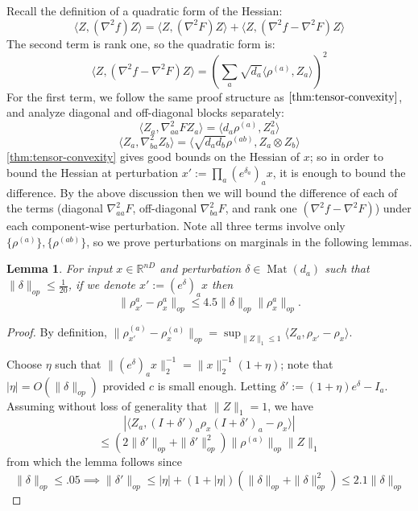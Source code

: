 \documentclass[aos]{imsart}
\newtheorem{lemma}[theorem]{Lemma}
\theoremstyle{definition}
\DeclareMathOperator{\mat}{Mat}
\newcommand{\R}{{\mathbb{R}}}
\newcommand{\samp}{x}
\begin{document}
\begin{appendix}
Recall the definition of a quadratic form of the Hessian:
\[ \langle Z, (\nabla^{2} f) Z \rangle = \langle Z, (\nabla^{2} F) Z \rangle + \langle Z, (\nabla^{2} f - \nabla^{2} F) Z \rangle     \]
The second term is rank one, so the quadratic form is:
\[ \langle Z, (\nabla^{2} f - \nabla^{2} F) Z \rangle = \left( \sum_{a} \sqrt{d_{a}} \langle \rho^{(a)}, Z_{a} \rangle   \right)^{2}       \]
For the first term, we follow the same proof structure as $\cref{thm:tensor-convexity}$, and analyze diagonal and off-diagonal blocks separately:
\[ \langle Z_{a}, \nabla^{2}_{aa} F Z_{a} \rangle = \langle d_{a} \rho^{(a)}, Z_{a}^{2} \rangle       \]
\[ \langle Z_{a}, \nabla^{2}_{ba} Z_{b} \rangle = \langle \sqrt{d_{a} d_{b}} \rho^{(ab)}, Z_{a} \otimes Z_{b} \rangle   \]
\cref{thm:tensor-convexity} gives good bounds on the Hessian of $\samp$; so in order to bound the Hessian at perturbation $\samp' := \prod_{a} (e^{\delta_{a}})_{a} \samp$, it is enough to bound the difference. By the above discussion then we will bound the difference of each of the terms (diagonal $\nabla^{2}_{aa} F$, off-diagonal $\nabla^{2}_{ba} F$, and rank one $(\nabla^{2} f - \nabla^{2} F)$) under each component-wise perturbation. Note all three terms involve only $\{\rho^{(a)}\}, \{\rho^{(ab)}\}$, so we prove perturbations on marginals in the following lemmas.

\begin{lemma} \label{atoaaRobustness}
For input $\samp \in \R^{nD}$ and perturbation $\delta \in \mat(d_{a})$ such that $\|\delta\|_{op} \leq \frac{1}{20}$, if we denote $\samp' := (e^{\delta})_{a} \samp$ then
\[ \|\rho_{\samp'}^{a} - \rho_{\samp}^{a}\|_{op} \leq 4.5 \|\delta\|_{op} \|\rho_{\samp}^{a}\|_{op}   . \]
\end{lemma}
\begin{proof} By definition, $\|\rho_{\samp'}^{(a)} - \rho_{\samp}^{(a)}\|_{op} = \sup_{\|Z\|_{1} \leq 1} \langle Z_{a}, \rho_{\samp'} - \rho_{\samp} \rangle $.


Choose $\eta$ such that  $\|(e^{\delta})_{a} \samp\|_{2}^{-1} = \|\samp\|_{2}^{-1} (1 + \eta)$; note that $|\eta| = O(\|\delta\|_{op})$ provided $c$ is small enough. Letting $\delta' := (1+\eta)e^{\delta} - I_{a}$. Assuming without loss of generality that $\|Z\|_{1} = 1$, we have
\[ | \langle Z_{a}, (I+\delta')_a \rho_{\samp} (I+\delta')_a - \rho_{\samp} \rangle | \]
\[ \leq (2\|\delta'\|_{op} + \|\delta'\|_{op}^{2}) \|\rho^{(a)}\|_{op} \|Z\|_{1}    \]
from which the lemma follows since
\[ \|\delta\|_{op} \leq .05 \implies \|\delta'\|_{op} \leq |\eta| + (1+|\eta|)(\|\delta\|_{op} + \|\delta\|_{op}^{2}) \leq  2.1 \|\delta\|_{op} \]
\end{proof}


\end{appendix}
\end{document}

